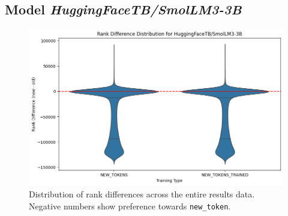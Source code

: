 \subsection*{Model \textit{HuggingFaceTB/SmolLM3-3B}}
\begin{figure}[H]
    \centering
    \includegraphics[width=1\textwidth]{Figures//Appendix/violin_smol3B.png}
    \caption{Distribution of rank differences across the entire results data. Negative numbers show preference towards \texttt{new\_token}.}
    \label{fig:violin_rank_dist:smol3B}
\end{figure}
